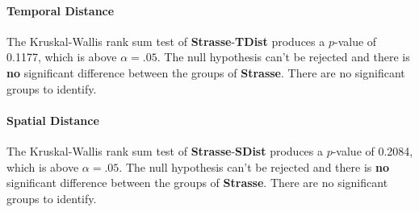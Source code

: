 \paragraph{Temporal Distance}
The Kruskal-Wallis rank sum test of \textbf{Strasse}-\textbf{TDist} produces a $p$-value of 0.1177, which is above $\alpha=.05$. The null hypothesis can't be rejected and there is \textbf{no} significant difference between the groups of \textbf{Strasse}. There are no significant groups to identify.

\paragraph{Spatial Distance}
The Kruskal-Wallis rank sum test of \textbf{Strasse}-\textbf{SDist} produces a $p$-value of 0.2084, which is above $\alpha=.05$. The null hypothesis can't be rejected and there is \textbf{no} significant difference between the groups of \textbf{Strasse}. There are no significant groups to identify.

